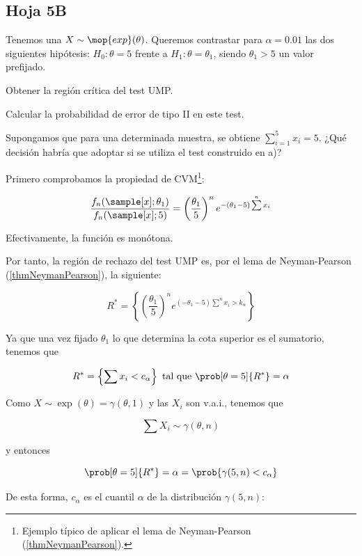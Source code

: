 \newpage
\subsection{Hoja 5B}

\begin{problem}[1]
Tenemos una $X \sim \mop{exp}(\theta)$. Queremos contrastar para $\alpha = 0.01$ las dos siguientes hipótesis: $H_0: \theta = 5$ frente a $H_1: \theta = \theta_1$, siendo $\theta_1 > 5$ un valor prefijado.

\ppart Obtener la región crítica del test UMP.

\ppart Calcular la probabilidad de error de tipo II en este test.

\ppart Supongamos que para una determinada muestra, se obtiene $\sum_{i=1}^5 x_i= 5$. ¿Qué decisión habría que adoptar si se utiliza el test construido en a)?

\solution

\spart Primero comprobamos la propiedad de CVM\footnote{Ejemplo típico de aplicar el lema de Neyman-Pearson (\ref{thmNeymanPearson}).}:

\[ \frac{f_n(\sample[x];\theta_1)}{f_n(\sample[x];5)} = \left(\frac{\theta_1}{5}\right)^n e^{-(\theta_1 - 5)\sum\limits^n x_i} \]

Efectivamente, la función es monótona. %

Por tanto, la región de rechazo del test UMP es, por el lema de Neyman-Pearson (\ref{thmNeymanPearson}), la siguiente:

\[
R^{\ast} =
\left\{ \left(\frac{\theta_1}{5}\right)^n e^{(-\theta_1-5)\sum\limits^n x_i > k_\alpha}\right\}
\]

Ya que una vez fijado $\theta_1$ lo que determina la cota superior es el sumatorio, tenemos que

\[
R^{\ast} =
\left\{\sum x_i < c_{\alpha}\right\}
\text{ tal que }
\prob[\theta = 5]{ R^{\ast} } = \alpha
\]

Como $X \sim \exp(\theta) = \gamma(\theta, 1)$ y las $X_i$ son v.a.i., tenemos que 

\[ \sum X_i \sim \gamma(\theta, n) \]

y entonces

\[ \prob[\theta=5]{R^{\ast}} = \alpha = \prob{\gamma(5, n) < c_\alpha} \]

De esta forma, $c_\alpha$ es el cuantil $\alpha$ de la distribución $\gamma(5, n)$:


\end{problem}
